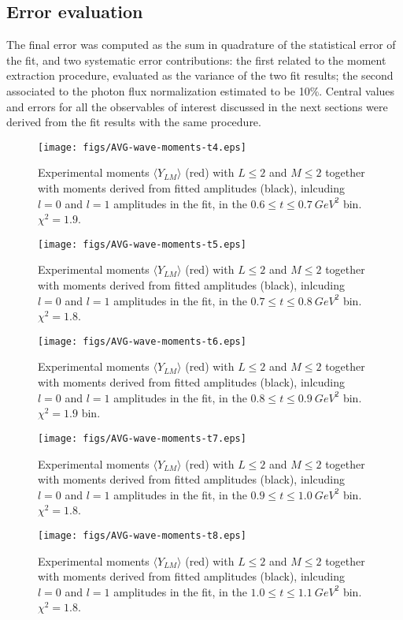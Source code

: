 \documentclass[twocolumn,superscriptaddress,prd]{revtex4}
\begin{document}
\subsection{Error evaluation}
The final error was computed as the sum in quadrature of the statistical error of the fit, and two systematic error contributions: the first related to the moment extraction procedure, evaluated as the variance of the two fit results; the second associated to the photon flux normalization estimated to be 10\%. Central values and errors for all the observables of interest discussed in the next sections were derived from the fit results with the same procedure.

\begin{figure}
\texttt{[image: figs/AVG-wave-moments-t4.eps]}
\caption{Experimental moments $\langle Y_{LM} \rangle$ (red) with $L \leq 2$ and $M \leq 2$ together with moments derived from fitted amplitudes (black), inlcuding $l=0$ and $l=1$ amplitudes in the fit, in the $0.6 \le t \le 0.7 \ GeV^2$ bin. $\chi^2 = 1.9$.}
\label{fig:mom_results_start}
\end{figure}
\begin{figure}
\texttt{[image: figs/AVG-wave-moments-t5.eps]}
\caption{Experimental moments $\langle Y_{LM} \rangle$ (red) with $L \leq 2$ and $M \leq 2$ together with moments derived from fitted amplitudes (black), inlcuding $l=0$ and $l=1$ amplitudes in the fit, in the $0.7 \le t \le 0.8 \ GeV^2$ bin. $\chi^2 = 1.8$.}
\label{fig:results1}
\end{figure}
\begin{figure}
\texttt{[image: figs/AVG-wave-moments-t6.eps]}
\caption{Experimental moments $\langle Y_{LM} \rangle$ (red) with $L \leq 2$ and $M \leq 2$ together with moments derived from fitted amplitudes (black), inlcuding $l=0$ and $l=1$ amplitudes in the fit, in the $0.8 \le t \le 0.9 \ GeV^2$ bin. $\chi^2 = 1.9$ bin.}
\label{fig:results1}
\end{figure}
\begin{figure}
\texttt{[image: figs/AVG-wave-moments-t7.eps]}
\caption{Experimental moments $\langle Y_{LM} \rangle$ (red) with $L \leq 2$ and $M \leq 2$ together with moments derived from fitted amplitudes (black), inlcuding $l=0$ and $l=1$ amplitudes in the fit, in the $0.9 \le t \le 1.0 \ GeV^2$ bin. $\chi^2 = 1.8$.}
\label{fig:results1}
\end{figure}
\begin{figure}
\texttt{[image: figs/AVG-wave-moments-t8.eps]}
\caption{Experimental moments $\langle Y_{LM} \rangle$ (red) with $L \leq 2$ and $M \leq 2$ together with moments derived from fitted amplitudes (black), inlcuding $l=0$ and $l=1$ amplitudes in the fit, in the $1.0 \le t \le 1.1 \ GeV^2$ bin. $\chi^2 = 1.8$.}
\label{fig:results1}
\end{figure}
\end{document}
